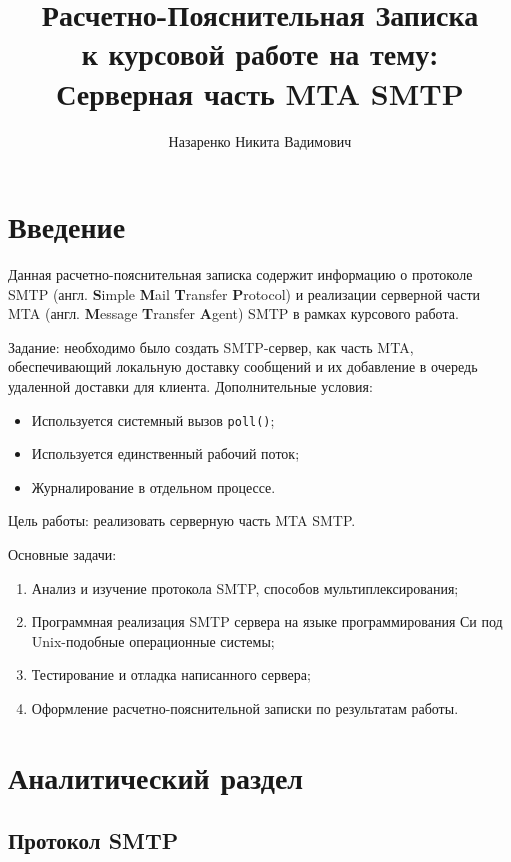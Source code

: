 \documentclass[a4paper,12pt]{report}
\title{Расчетно-Пояснительная Записка \\ 
    \large к курсовой работе на тему: \\ Серверная часть MTA SMTP}
\author{Назаренко Никита Вадимович}
\begin{document}
\maketitle


\tableofcontents

\clearpage
\chapter*{Введение}

Данная расчетно-пояснительная записка содержит информацию о протоколе SMTP (англ. \textbf{S}imple \textbf{M}ail \textbf{T}ransfer \textbf{P}rotocol) и реализации серверной части MTA (англ. \textbf{M}essage \textbf{T}ransfer \textbf{A}gent) SMTP в рамках курсового работа.

Задание: необходимо было создать SMTP-сервер, как часть MTA, обеспечивающий локальную доставку сообщений и их добавление в очередь удаленной доставки для клиента. Дополнительные условия:
\begin{itemize}
\item Используется системный вызов \texttt{poll()};
\item Используется единственный рабочий поток;
\item Журналирование в отдельном процессе.
\end{itemize}

Цель работы: реализовать серверную часть MTA SMTP.

Основные задачи:
\begin{enumerate}
    \item Анализ и изучение протокола SMTP, способов мультиплексирования;
    \item Программная реализация SMTP сервера на языке программирования Си под Unix-подобные операционные системы;
    \item Тестирование и отладка написанного сервера;
    \item Оформление расчетно-пояснительной записки по результатам работы.
\end{enumerate}


\chapter{Аналитический раздел}


\section{Протокол SMTP}
\end{document}
